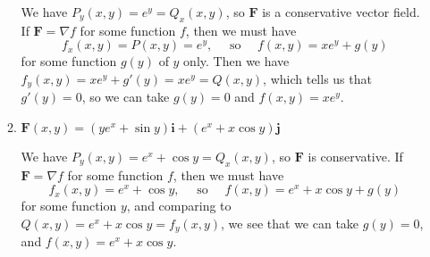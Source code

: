 \documentclass[letterpaper,12pt]{article}
\renewcommand{\i}{\mathbf{i}}
\renewcommand{\j}{\mathbf{j}}
\newcommand{\F}{\mathbf{F}}
\begin{document}
\begin{enumerate}
\begin{enumerate}
We have $P_y(x,y) = e^y = Q_x(x,y)$, so $\F$ is a conservative vector field. If $\F = \nabla f$ for some function $f$, then we must have
\[
 f_x(x,y) = P(x,y) = e^y, \quad \text{ so } \quad f(x,y) = xe^y+g(y)
\]
for some function $g(y)$ of $y$ only. Then we have $f_y(x,y) = xe^y + g'(y) = xe^y = Q(x,y)$, which tells us that $g'(y)=0$, so we can take $g(y)=0$ and $f(x,y) = xe^y$.

 \item $\F(x,y) = (ye^x+\sin y)\i+(e^x+x\cos y)\j$

\bigskip

We have $P_y(x,y) = e^x+\cos y = Q_x(x,y)$, so $\F$ is conservative. If $\F = \nabla f$ for some function $f$, then we must have
\[
 f_x(x,y) = e^x+\cos y, \quad \text{ so } \quad f(x,y) = e^x+x\cos y+g(y)
\]
for some function $y$, and comparing to $Q(x,y) = e^x+x\cos y = f_y(x,y)$, we see that we can take $g(y)=0$, and $f(x,y) = e^x+x\cos y$.
\end{enumerate}

 \end{enumerate}
\end{document}
